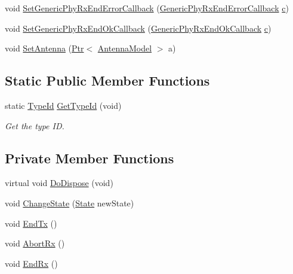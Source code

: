 \begin{DoxyCompactItemize}
\item 
void \hyperlink{classns3_1_1HalfDuplexIdealPhy_a1aa4644c11a157a7a6195a1ae3ff2e10}{Set\+Generic\+Phy\+Rx\+End\+Error\+Callback} (\hyperlink{namespacens3_a726dc36898b6cda5b4855ee1671f51da}{Generic\+Phy\+Rx\+End\+Error\+Callback} \hyperlink{mmwave_2model_2fading-traces_2fading__trace__generator_8m_ae0323a9039add2978bf5b49550572c7c}{c})
\item 
void \hyperlink{classns3_1_1HalfDuplexIdealPhy_a687beeb558079a0408083dc3dc321c70}{Set\+Generic\+Phy\+Rx\+End\+Ok\+Callback} (\hyperlink{namespacens3_a46c93af76ee9401eef0753645edc589d}{Generic\+Phy\+Rx\+End\+Ok\+Callback} \hyperlink{mmwave_2model_2fading-traces_2fading__trace__generator_8m_ae0323a9039add2978bf5b49550572c7c}{c})
\item 
void \hyperlink{classns3_1_1HalfDuplexIdealPhy_a64a6aaba4241e17ca11c3aaeb6d0a895}{Set\+Antenna} (\hyperlink{classns3_1_1Ptr}{Ptr}$<$ \hyperlink{classns3_1_1AntennaModel}{Antenna\+Model} $>$ a)
\end{DoxyCompactItemize}
\subsection*{Static Public Member Functions}
\begin{DoxyCompactItemize}
\item 
static \hyperlink{classns3_1_1TypeId}{Type\+Id} \hyperlink{classns3_1_1HalfDuplexIdealPhy_af4705566e19a5fd9a6df811f20f20cd6}{Get\+Type\+Id} (void)
\begin{DoxyCompactList}\small\item\em Get the type ID. \end{DoxyCompactList}\end{DoxyCompactItemize}
\subsection*{Private Member Functions}
\begin{DoxyCompactItemize}
\item 
virtual void \hyperlink{classns3_1_1HalfDuplexIdealPhy_a94c4dd0e18bc6c4999d75d65ef80c27e}{Do\+Dispose} (void)
\item 
void \hyperlink{classns3_1_1HalfDuplexIdealPhy_a9eb5135bc6ae1ddb50920c92f64222cd}{Change\+State} (\hyperlink{classns3_1_1HalfDuplexIdealPhy_acc684e2a6ce03ae8ff429ce480f61c3a}{State} new\+State)
\item 
void \hyperlink{classns3_1_1HalfDuplexIdealPhy_abf572203288ca08774135c02691215a8}{End\+Tx} ()
\item 
void \hyperlink{classns3_1_1HalfDuplexIdealPhy_ad741468b96575a6cc5c72893f6b36a74}{Abort\+Rx} ()
\item 
void \hyperlink{classns3_1_1HalfDuplexIdealPhy_a9f1d324d44186902b06bb1637765f8bc}{End\+Rx} ()
\end{DoxyCompactItemize}
